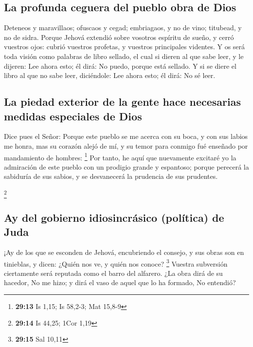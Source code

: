 \hypertarget{la-profunda-ceguera-del-pueblo-obra-de-dios}{%
\subsection{La profunda ceguera del pueblo obra de
Dios}\label{la-profunda-ceguera-del-pueblo-obra-de-dios}}

 Deteneos y maravillaos; ofuscaos y cegad; embriagaos, y
no de vino; titubead, y no de sidra.  Porque Jehová
extendió sobre vosotros espíritu de sueño, y cerró vuestros ojos: cubrió
vuestros profetas, y vuestros principales videntes.  Y os
será toda visión como palabras de libro sellado, el cual si dieren al
que sabe leer, y le dijeren: Lee ahora esto; él dirá: No puedo, porque
está sellado.  Y si se diere el libro al que no sabe
leer, diciéndole: Lee ahora esto; él dirá: No sé leer.

\hypertarget{la-piedad-exterior-de-la-gente-hace-necesarias-medidas-especiales-de-dios}{%
\subsection{La piedad exterior de la gente hace necesarias medidas
especiales de
Dios}\label{la-piedad-exterior-de-la-gente-hace-necesarias-medidas-especiales-de-dios}}

 Dice pues el Señor: Porque este pueblo se me acerca con
su boca, y con sus labios me honra, mas su corazón alejó de mí, y su
temor para conmigo fué enseñado por mandamiento de hombres: \footnote{\textbf{29:13}
  Is 1,15; Is 58,2-3; Mat 15,8-9}  Por tanto, he aquí que
nuevamente excitaré yo la admiración de este pueblo con un prodigio
grande y espantoso; porque perecerá la sabiduría de sus sabios, y se
desvanecerá la prudencia de sus prudentes.

\footnote{\textbf{29:14} Is 44,25; 1Cor 1,19}

\hypertarget{ay-del-gobierno-idiosincruxe1sico-poluxedtica-de-juda}{%
\subsection{Ay del gobierno idiosincrásico (política) de
Juda}\label{ay-del-gobierno-idiosincruxe1sico-poluxedtica-de-juda}}

 ¡Ay de los que se esconden de Jehová, encubriendo el
consejo, y sus obras son en tinieblas, y dicen: ¿Quién nos ve, y quién
nos conoce? \footnote{\textbf{29:15} Sal 10,11}  Vuestra
subversión ciertamente será reputada como el barro del alfarero. ¿La
obra dirá de su hacedor, No me hizo; y dirá el vaso de aquel que lo ha
formado, No entendió?

